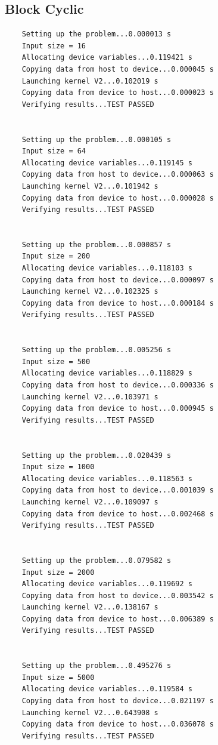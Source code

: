 \documentclass{article}
\begin{document}
\subsection{Block Cyclic}
\begin{verbatim}
	Setting up the problem...0.000013 s
	Input size = 16
	Allocating device variables...0.119421 s
	Copying data from host to device...0.000045 s
	Launching kernel V2...0.102019 s
	Copying data from device to host...0.000023 s
	Verifying results...TEST PASSED
	
	
	Setting up the problem...0.000105 s
	Input size = 64
	Allocating device variables...0.119145 s
	Copying data from host to device...0.000063 s
	Launching kernel V2...0.101942 s
	Copying data from device to host...0.000028 s
	Verifying results...TEST PASSED
	
	
	Setting up the problem...0.000857 s
	Input size = 200
	Allocating device variables...0.118103 s
	Copying data from host to device...0.000097 s
	Launching kernel V2...0.102325 s
	Copying data from device to host...0.000184 s
	Verifying results...TEST PASSED
	
	
	Setting up the problem...0.005256 s
	Input size = 500
	Allocating device variables...0.118829 s
	Copying data from host to device...0.000336 s
	Launching kernel V2...0.103971 s
	Copying data from device to host...0.000945 s
	Verifying results...TEST PASSED
	
	
	Setting up the problem...0.020439 s
	Input size = 1000
	Allocating device variables...0.118563 s
	Copying data from host to device...0.001039 s
	Launching kernel V2...0.109097 s
	Copying data from device to host...0.002468 s
	Verifying results...TEST PASSED
	
	
	Setting up the problem...0.079582 s
	Input size = 2000
	Allocating device variables...0.119692 s
	Copying data from host to device...0.003542 s
	Launching kernel V2...0.138167 s
	Copying data from device to host...0.006389 s
	Verifying results...TEST PASSED
	
	
	Setting up the problem...0.495276 s
	Input size = 5000
	Allocating device variables...0.119584 s
	Copying data from host to device...0.021197 s
	Launching kernel V2...0.643908 s
	Copying data from device to host...0.036078 s
	Verifying results...TEST PASSED
\end{verbatim}
	
\end{document}
